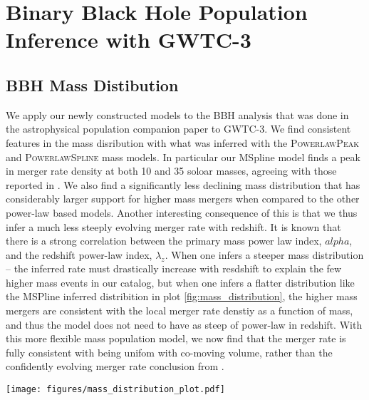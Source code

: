 \section{Binary Black Hole Population Inference with GWTC-3} \label{sec:results}



\subsection{BBH Mass Distibution} \label{sec:mass_dist}

We apply our newly constructed models to the BBH analysis that was done in the astrophysical population companion paper to GWTC-3. 
We find consistent features in the mass disribution with what was inferred with the \textsc{PowerlawPeak} and \textsc{PowerlawSpline} 
mass models. In particular our MSpline model finds a peak in merger rate density at both 10 and 35 soloar masses, agreeing with those reported
in . We also find a significantly less declining mass distribution that has considerably larger support for higher mass 
mergers when compared to the other power-law based models. Another interesting consequence of this is that we thus infer a much less steeply
evolving merger rate with redshift. It is known that there is a strong correlation between the primary mass power law index, $alpha$, and the 
redshift power-law index, $\lambda_z$. When one infers a steeper mass distribution -- the inferred rate must drastically increase 
with resdshift to explain the few higher mass events in our catalog, but when one infers a flatter distribution like the MSPline inferred
distribition in plot \ref{fig:mass_distribution}, the higher mass mergers are consistent with the local merger rate denstiy as a function of mass, 
and thus the model does not need to have as steep of power-law in redshift. With this more flexible mass population model, we now 
find that the merger rate is fully consistent with being unifom with co-moving volume, rather than the confidently evolving merger rate 
conclusion from . 

\begin{figure*}[ht!]
    \begin{centering}
        \texttt{[image: figures/mass\_distribution\_plot.pdf]}
        \caption{Plot showing the primary mass distribution inferred with the \textsc{MSpline} model with 40 knots for $m_1$. We show the results for the 
        \textsc{PowerlawSpline} (blue) model from the LVK's GWTC-3 population analyses.}
        \label{fig:mass_distribution}
    \end{centering}
\end{figure*}


